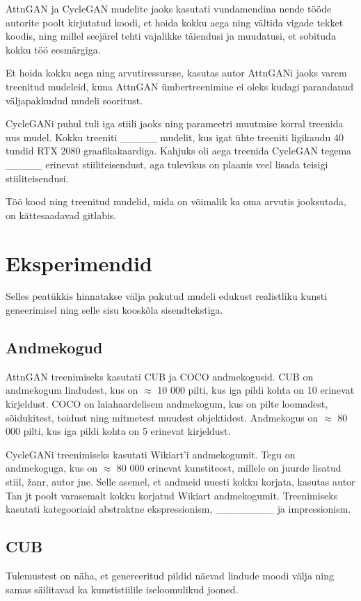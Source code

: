 \documentclass{vilgym}
\begin{document}
	AttnGAN ja CycleGAN mudelite jaoks kasutati vundamendina nende tööde autorite poolt kirjutatud koodi, et hoida kokku aega ning vältida vigade tekket koodis, ning millel seejärel tehti vajalikke täiendusi ja muudatusi, et sobituda kokku töö eesmärgiga.

	Et hoida kokku aega ning arvutiressursse, kasutas autor AttnGANi jaoks varem treenitud mudeleid, kuna AttnGAN ümbertreenimine ei oleks kudagi parandanud väljapakkudud mudeli sooritust.

	CycleGANi puhul tuli iga stiili jaoks ning parameetri muutmise korral treenida uus mudel. Kokku treeniti \_\_\_\_\_ mudelit, kus igat ühte treeniti ligikaudu 40 tundid RTX 2080 graafikakaardiga. Kahjuks oli aega treenida CycleGAN tegema \_\_\_\_\_ erinevat stiiliteisendust, aga tulevikus on plaanis veel lisada teisigi stiiliteisendusi.

	Töö kood ning treenitud mudelid, mida on võimalik ka oma arvutis jooksutada, on kättesaadavad gitlabis.

	\section{Eksperimendid}
	Selles peatükkis hinnatakse välja pakutud mudeli edukust realistliku kunsti geneerimisel ning selle sisu kooskõla sisendtekstiga.

	\subsection{Andmekogud}
	AttnGAN treenimiseks kasutati CUB\parencite{cub} ja COCO\parencite{srgan} andmekogusid. CUB on andmekogum lindudest, kus on $\approx$ 10 000 pilti, kus iga pildi kohta on 10 erinevat kirjeldust. COCO on laiahaardelisem andmekogum, kus on pilte loomadest, sõidukitest, toidust ning mitmetest muudest objektidest. Andmekogus on $\approx$ 80 000 pilti, kus iga pildi kohta on 5 erinevat kirjeldust.

	CycleGANi treenimiseks kasutati Wikiart'i andmekogumit\parencite{wikiart}. Tegu on andmekoguga, kus on $\approx$ 80 000 erinevat kunstiteost, millele on juurde lisatud stiil, žanr, autor jne. Selle asemel, et andmeid uuesti kokku korjata, kasutas autor Tan jt poolt varasemalt kokku korjatud Wikiart andmekogumit\parencite{artgan}. Treenimiseks kasutati kategooriaid abstraktne ekspressionism, \_\_\_\_\_\_\_\_ ja impressionism.

	\subsection{CUB}
	Tulemustest on näha, et genereeritud pildid näevad lindude moodi välja ning samas säilitavad ka kunstistiilile iseloomulikud jooned.
\end{document}
